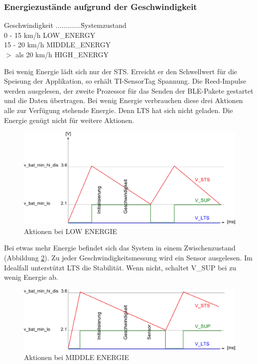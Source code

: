 \subsubsection*{Energiezustände aufgrund der Geschwindigkeit}
\begin{tabbing}
   Geschwindigkeit .............\quad\= Systemzustand\\[0.8ex]
   0 - 15 km/h        \> LOW\_ENERGY\\
   15 - 20 km/h       \> MIDDLE\_ENERGY\\
   $>$ als 20 km/h    \> HIGH\_ENERGY\\
    
\end{tabbing}

Bei wenig Energie lädt sich nur der STS. Erreicht er den Schwellwert für die Speisung der Applikation, so erhält TI-SensorTag Spannung. Die Reed-Impulse werden ausgelesen, der zweite Prozessor für das Senden der BLE-Pakete gestartet und die Daten übertragen. Bei wenig Energie verbrauchen diese drei Aktionen alle zur Verfügung stehende Energie. Denn LTS hat sich nicht geladen. Die Energie genügt nicht für weitere Aktionen.

\begin{figure}[ht]
  \includegraphics[width=1.0\textwidth]{3Vorgehen/imag/LOW_ENERGY.png}
  \caption{Aktionen bei LOW ENERGIE}
  \label{LOW_ENER}
\end{figure}

Bei etwas mehr Energie befindet sich das System in einem Zwischenzustand (Abbildung \ref{MID_ENER}). Zu jeder Geschwindigkeitsmessung wird ein Sensor ausgelesen. Im Idealfall unterstützt LTS die Stabilität. Wenn nicht, schaltet V\_SUP bei zu wenig Energie ab.

\begin{figure}[ht]
  \includegraphics[width=1.0\textwidth]{3Vorgehen/imag/MIDDLE_ENERGY.png}
  \caption{Aktionen bei MIDDLE ENERGIE}
  \label{MID_ENER}
\end{figure}

